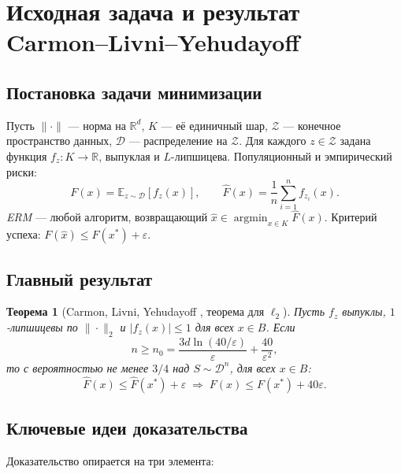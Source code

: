 \documentclass[12pt,a4paper]{article}
\theoremstyle{plain}
\newtheorem{theorem}{Теорема}[section]
\theoremstyle{definition}
\DeclareMathOperator*{\argmin}{argmin}
\newcommand{\E}{\mathbb{E}}
\newcommand{\R}{\mathbb{R}}
\newcommand{\cZ}{\mathcal{Z}}
\newcommand{\cD}{\mathcal{D}}
\newcommand{\hatF}{\hat{F}}
\begin{document}
\section{Исходная задача и результат Carmon--Livni--Yehudayoff}

\subsection{Постановка задачи минимизации}

Пусть $\|\cdot\|$ --- норма на $\R^d$, $K$ --- её единичный шар, $\cZ$ --- конечное пространство данных, $\cD$ --- распределение на $\cZ$. Для каждого $z\in\cZ$ задана функция $f_z:K\to\R$, выпуклая и $L$-липшицева. Популяционный и эмпирический риски:
\[
    F(x) = \E_{z\sim\cD}[f_z(x)], \qquad \hatF(x) = \frac{1}{n}\sum_{i=1}^n f_{z_i}(x).
\]
\emph{ERM} --- любой алгоритм, возвращающий $\hat{x}\in\argmin_{x\in K}\hatF(x)$. Критерий успеха: $F(\hat{x})\le F(x^*)+\varepsilon$.

\subsection{Главный результат}

\begin{theorem}[Carmon, Livni, Yehudayoff \cite{CLY2023}, теорема для $\ell_2$]
\label{thm:CLY}
Пусть $f_z$ выпуклы, $1$-липшицевы по $\|\cdot\|_2$ и $|f_z(x)|\le 1$ для всех $x\in B$. Если
\[
    n \ge n_0 = \frac{3d\ln(40/\varepsilon)}{\varepsilon} + \frac{40}{\varepsilon^2},
\]
то с вероятностью не менее $3/4$ над $S\sim\cD^n$, для всех $x\in B$:
\[
    \hatF(x) \le \hatF(x^*)+\varepsilon \;\Rightarrow\; F(x)\le F(x^*)+40\varepsilon.
\]
\end{theorem}

\subsection{Ключевые идеи доказательства}

Доказательство опирается на три элемента:
\end{document}
